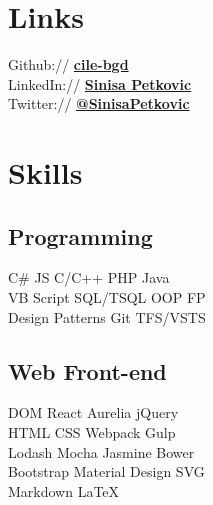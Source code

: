 \documentclass[letterpaper]{deedy-resume} %
\begin{document}
\begin{minipage}[t]{0.33\textwidth} %


\section{Links} 

Github:// \href{https://github.com/cile-bgd}{\bf cile-bgd} \\
LinkedIn:// \href{https://www.linkedin.com/in/sinisa-petkovic-b704034/}{\bf Sinisa Petkovic} \\
Twitter:// \href{https://twitter.com/SinisaPetkovic}{\bf @SinisaPetkovic} \\



\section{Skills}

\subsection{Programming}

C\# \textbullet{} JS \textbullet{} C/C++ \textbullet{} PHP \textbullet{} Java\\
VB Script \textbullet{} SQL/TSQL \textbullet{} OOP \textbullet{} FP\\
Design Patterns \textbullet{} Git \textbullet{} TFS/VSTS

\sectionspace %

\subsection{Web Front-end}

DOM \textbullet{} React \textbullet{} Aurelia\textbullet{} jQuery\\
HTML\textbullet{} CSS \textbullet{} Webpack \textbullet{} Gulp\\
Lodash \textbullet{} Mocha \textbullet{} Jasmine \textbullet{} Bower\\
Bootstrap \textbullet{} Material Design \textbullet{} SVG\\
Markdown \textbullet{} \LaTeX\


\end{minipage}
\end{document}
